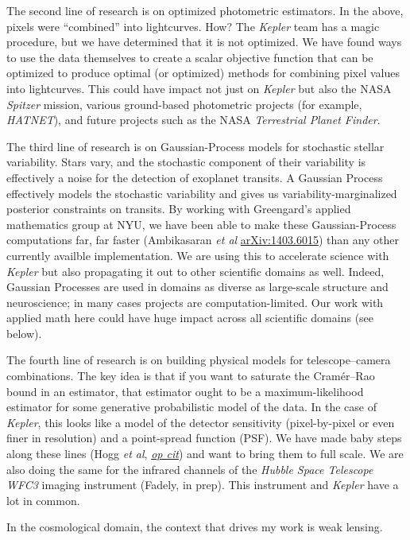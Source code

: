 \documentclass[11pt, letterpaper]{article}
\newcommand{\arxiv}[1]{\href{http://arxiv.org/abs/#1}{arXiv:#1}}
\newcommand{\opcit}[1]{\href{http://arxiv.org/abs/#1}{\textit{op cit}}}
\begin{document}
The second line of research is on optimized photometric estimators.
In the above, pixels were ``combined'' into lightcurves.
How?
The \textsl{Kepler} team has a magic procedure, but we have determined
that it is not optimized.
We have found ways to use the data themselves to create a scalar
objective function that can be optimized to produce optimal (or
optimized) methods for combining pixel values into lightcurves.
This could have impact not just on \textsl{Kepler} but also the NASA
\textsl{Spitzer} mission, various ground-based photometric projects
(for example, \textsl{HATNET}), and future projects such as the NASA
\textsl{Terrestrial Planet Finder}.

The third line of research is on Gaussian-Process models for
stochastic stellar variability.
Stars vary, and the stochastic component of their variability is
effectively a noise for the detection of exoplanet transits.
A Gaussian Process effectively models the stochastic variability and
gives us variability-marginalized posterior constraints on transits.
By working with Greengard's applied mathematics group at NYU, we have
been able to make these Gaussian-Process computations far, far faster
(Ambikasaran \textit{et al} \arxiv{1403.6015})
than any other currently availble implementation.
We are using this to accelerate science with \textsl{Kepler} but also
propagating it out to other scientific domains as well.
Indeed, Gaussian Processes are used in domains as diverse as
large-scale structure and neuroscience; in many cases projects are
computation-limited.
Our work with applied math here could have huge impact across all
scientific domains (see below).

The fourth line of research is on building physical models for
telescope--camera combinations.
The key idea is that if you want to saturate the Cram\'er--Rao bound
in an estimator, that estimator ought to be a maximum-likelihood
estimator for some generative probabilistic model of the data.
In the case of \textsl{Kepler}, this looks like a model of the
detector sensitivity (pixel-by-pixel or even finer in resolution) and
a point-spread function (PSF).  
We have made baby steps along these lines
(Hogg \textit{et al}, \opcit{1403.6015})
and want to bring them to full scale.
We are also doing the same for the infrared channels of the
\textsl{Hubble Space Telescope} \textsl{WFC3} imaging instrument
(Fadely, in prep).
This instrument and \textsl{Kepler} have a lot in common.

In the cosmological domain, the context that drives my work is weak
lensing.
\end{document}
